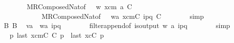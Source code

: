 \begin{isabellebody}
\ \ \ \ \ \ \isamarkupfalse%
\ MRComposedNat{\isacharbrackleft}{\kern0pt}of\ {\isasymC}\isactrlsub {\isasymI}\isactrlsub {\isasymmm}\ {}\ w\ xcm\ a\ C{}{\isacharbrackright}{\kern0pt}\isanewline
\ \ \ \ \ \ \ \ \ \ \ \ MRComposedNat{\isacharbrackleft}{\kern0pt}of\ {\isasymC}\isactrlsub {\isasymI}\isactrlsub {\isasymmm}\ {}\ {\isachardoublequoteopen}w{\isasymcdot}{\isacharbrackleft}{\kern0pt}a{\isacharbrackright}{\kern0pt}{\isachardoublequoteclose}\ {\isachardoublequoteopen}xcm{\isasymcdot}{\isacharbrackleft}{\kern0pt}C{}{\isacharbrackright}{\kern0pt}{\isachardoublequoteclose}\ {\isachardoublequoteopen}{\isacharquery}{\kern0pt}{\isasymlangle}{\isacharparenleft}{\kern0pt}i\isactrlbsup p{\isasymrightarrow}q\isactrlesup {\isacharparenright}{\kern0pt}{\isasymrangle}{\isachardoublequoteclose}\ C{}{\isacharbrackright}{\kern0pt}\isanewline
\ \ \ \ \ \ \isamarkupfalse%
\ simp\isanewline
\ \ \ \ \isamarkupfalse%
\ \isamarkupfalse%
\ B{}\ B{}\ \isamarkupfalse%
\ {\isachardoublequoteopen}v{\isasymcdot}{\isacharbrackleft}{\kern0pt}a{\isacharbrackright}{\kern0pt}\ {\isacharequal}{\kern0pt}\ {\isacharparenleft}{\kern0pt}w{\isasymcdot}{\isacharbrackleft}{\kern0pt}a{\isacharcomma}{\kern0pt}\ {\isacharquery}{\kern0pt}{\isasymlangle}{\isacharparenleft}{\kern0pt}i\isactrlbsup p{\isasymrightarrow}q\isactrlesup {\isacharparenright}{\kern0pt}{\isasymrangle}{\isacharbrackright}{\kern0pt}{\isacharparenright}{\kern0pt}{\isasymdown}\isactrlsub {\isacharbang}{\kern0pt}{\isachardoublequoteclose}\isanewline
\ \ \ \ \ \ \isamarkupfalse%
\ filter{\isacharunderscore}{\kern0pt}append{\isacharbrackleft}{\kern0pt}of\ is{\isacharunderscore}{\kern0pt}output\ w\ {\isachardoublequoteopen}{\isacharbrackleft}{\kern0pt}a{\isacharcomma}{\kern0pt}\ {\isacharquery}{\kern0pt}{\isasymlangle}{\isacharparenleft}{\kern0pt}i\isactrlbsup p{\isasymrightarrow}q\isactrlesup {\isacharparenright}{\kern0pt}{\isasymrangle}{\isacharbrackright}{\kern0pt}{\isachardoublequoteclose}{\isacharbrackright}{\kern0pt}\isanewline
\ \ \ \ \ \ \isamarkupfalse%
\ simp\isanewline
\ \ \ \ \isamarkupfalse%
\ \isamarkupfalse%
\ {\isachardoublequoteopen}{\isasymforall}p{\isachardot}{\kern0pt}\ last\ {\isacharparenleft}{\kern0pt}{\isasymC}\isactrlsub {\isasymI}\isactrlsub {\isasymmm}{\isacharhash}{\kern0pt}{\isacharparenleft}{\kern0pt}xcm{\isasymcdot}{\isacharbrackleft}{\kern0pt}C{}{\isacharcomma}{\kern0pt}\ C{}{\isacharbrackright}{\kern0pt}{\isacharparenright}{\kern0pt}{\isacharparenright}{\kern0pt}\ p\ {\isacharequal}{\kern0pt}\ {\isacharparenleft}{\kern0pt}last\ {\isacharparenleft}{\kern0pt}{\isasymC}\isactrlsub {\isasymI}\isactrlsub {\isasymzero}{\isacharhash}{\kern0pt}{\isacharparenleft}{\kern0pt}xc{\isasymcdot}{\isacharbrackleft}{\kern0pt}C{\isacharbrackright}{\kern0pt}{\isacharparenright}{\kern0pt}{\isacharparenright}{\kern0pt}\ p{\isacharcomma}{\kern0pt}\ {\isasymepsilon}{\isacharparenright}{\kern0pt}{\isachardoublequoteclose}\isanewline

\end{isabellebody}
